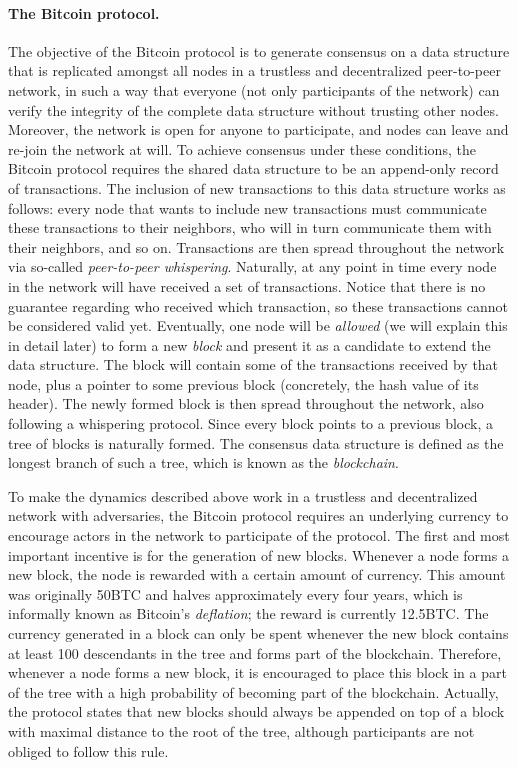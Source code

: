 \paragraph{\bf The Bitcoin protocol.} The objective of the Bitcoin protocol is to generate consensus on a data structure that is replicated amongst all nodes in a trustless 
and decentralized peer-to-peer network, in such a way that everyone (not only participants of the network) can verify the integrity of the complete data structure without trusting other nodes. Moreover, the network is open for anyone to participate, and nodes can leave and re-join the network at will. To achieve consensus under these conditions, the Bitcoin protocol requires the shared data structure to be an append-only record of transactions. The inclusion of new transactions to this data structure works as follows: every node that wants to include new transactions must communicate these transactions to their neighbors, who will in turn communicate them with their neighbors, and so on. Transactions are then spread throughout the network via so-called \emph{peer-to-peer whispering}. Naturally, at any point in time every node in the network will have received a set of transactions. Notice that there is no guarantee regarding who received which transaction, so these transactions cannot be considered valid yet. Eventually, one node will be \emph{allowed} (we will explain this in detail later) to form a new \emph{block} and present it as a candidate to extend the data structure. The block will contain some of the transactions received by that node, plus a pointer to some previous block (concretely, the hash value of its header). The newly formed block is then spread throughout the network, also following a whispering protocol. Since every block points to a previous block, a tree of blocks is naturally formed. The consensus data structure is defined as the longest branch of such a tree, which is known as the \emph{blockchain}.

To make the dynamics described above work in a trustless and decentralized network with adversaries, the Bitcoin protocol requires an underlying currency to encourage actors in the network to participate of the protocol. The first and most important incentive is for the generation of new blocks. Whenever a node forms a new block, the node is rewarded with a certain amount of currency. This amount was originally 50BTC and halves  approximately every four years, which is informally known as Bitcoin's \emph{deflation}; the reward is currently 12.5BTC. The currency generated in a block can only be spent whenever the new block contains at least 100 descendants in the tree and forms part of the blockchain. Therefore, whenever a node forms a new block, it is encouraged to place this block in a part of the tree with a high probability of becoming part of the blockchain. Actually, the protocol states that new blocks should always be appended on top of a block with maximal distance to the root of the tree, although participants are not obliged to follow this rule.

